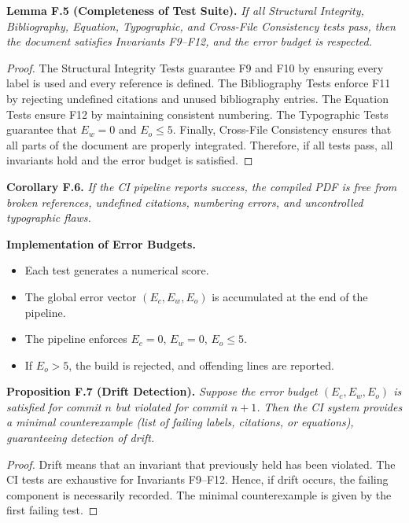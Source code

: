 \medskip
\noindent \textbf{Lemma F.5 (Completeness of Test Suite).}  
\emph{If all Structural Integrity, Bibliography, Equation, Typographic, and Cross-File Consistency tests pass, then the document satisfies Invariants F9–F12, and the error budget is respected.}

\begin{proof}  
The Structural Integrity Tests guarantee F9 and F10 by ensuring every label is used and every reference is defined. The Bibliography Tests enforce F11 by rejecting undefined citations and unused bibliography entries. The Equation Tests ensure F12 by maintaining consistent numbering. The Typographic Tests guarantee that $E_w=0$ and $E_o \leq 5$. Finally, Cross-File Consistency ensures that all parts of the document are properly integrated. Therefore, if all tests pass, all invariants hold and the error budget is satisfied.  
\end{proof}

\medskip
\noindent \textbf{Corollary F.6.} \emph{If the CI pipeline reports success, the compiled PDF is free from broken references, undefined citations, numbering errors, and uncontrolled typographic flaws.}

\medskip
\noindent \textbf{Implementation of Error Budgets.}

\begin{itemize}
  \item Each test generates a numerical score.  
  \item The global error vector $(E_c, E_w, E_o)$ is accumulated at the end of the pipeline.  
  \item The pipeline enforces $E_c = 0$, $E_w = 0$, $E_o \leq 5$.  
  \item If $E_o > 5$, the build is rejected, and offending lines are reported.  
\end{itemize}

\medskip
\noindent \textbf{Proposition F.7 (Drift Detection).}  
\emph{Suppose the error budget $(E_c, E_w, E_o)$ is satisfied for commit $n$ but violated for commit $n+1$. Then the CI system provides a minimal counterexample (list of failing labels, citations, or equations), guaranteeing detection of drift.}

\begin{proof}  
Drift means that an invariant that previously held has been violated. The CI tests are exhaustive for Invariants F9–F12. Hence, if drift occurs, the failing component is necessarily recorded. The minimal counterexample is given by the first failing test.  
\end{proof}

